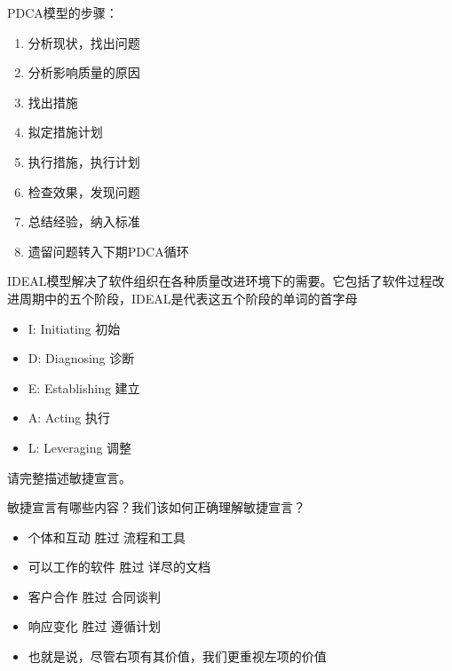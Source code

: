 \begin{solution}
PDCA模型的步骤：
\vspace{-0.8em}
\begin{multicols}{2}
    \begin{enumerate}[label=\arabic*.]
        \item 分析现状，找出问题
        \item 分析影响质量的原因
        \item 找出措施
        \item 拟定措施计划
        \item 执行措施，执行计划
        \item 检查效果，发现问题
        \item 总结经验，纳入标准
        \item 遗留问题转入下期PDCA循环
    \end{enumerate}
\end{multicols}
\vspace{-1em}

IDEAL模型解决了软件组织在各种质量改进环境下的需要。它包括了软件过程改进周期中的五个阶段，IDEAL是代表这五个阶段的单词的首字母
\vspace{-0.8em}
\begin{multicols}{3}
    \begin{itemize}
        \item I: Initiating 初始
        \item D: Diagnosing 诊断
        \item E: Establishing 建立
        \item A: Acting 执行
        \item L: Leveraging 调整
    \end{itemize}
\end{multicols}
\vspace{-1em}
\end{solution}



\begin{problem}[2020、2023]
请完整描述敏捷宣言。

敏捷宣言有哪些内容？我们该如何正确理解敏捷宣言？
\end{problem}

\begin{solution}
\vspace{-0.8em}
\begin{multicols}{2}
    \begin{itemize}
        \item 个体和互动 胜过 流程和工具
        \item 可以工作的软件 胜过 详尽的文档
        \item 客户合作 胜过 合同谈判
        \item 响应变化 胜过 遵循计划
    \end{itemize}
\end{multicols}
\vspace{-1em}
\vspace{-0.4em}
\begin{itemize}
    \item 也就是说，尽管右项有其价值，我们更重视左项的价值
\end{itemize}
\end{solution}


